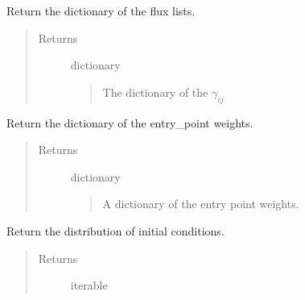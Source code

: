 \documentclass[letterpaper,10pt,english]{sphinxmanual}
\begin{document}
\begin{fulllineitems}

\begin{fulllineitems}
\label{neus/neus.doc:neus.window.Window.get_flux_lists}
Return the dictionary of the flux lists.
\begin{quote}\begin{description}
\item[{Returns}] \leavevmode
dictionary
\begin{quote}

The dictionary of the \(\gamma_{ij}\)
\end{quote}

\end{description}\end{quote}

\end{fulllineitems}


\begin{fulllineitems}
\label{neus/neus.doc:neus.window.Window.get_flux_weights}
Return the dictionary of the entry\_point weights.
\begin{quote}\begin{description}
\item[{Returns}] \leavevmode
dictionary
\begin{quote}

A dictionary of the entry point weights.
\end{quote}

\end{description}\end{quote}

\end{fulllineitems}


\begin{fulllineitems}
\label{neus/neus.doc:neus.window.Window.get_initial_conditions}
Return the distribution of initial conditions.
\begin{quote}\begin{description}
\item[{Returns}] \leavevmode
iterable
\begin{quote}


\end{quote}
\end{description}
\end{quote}
\end{fulllineitems}
\end{fulllineitems}
\end{document}
